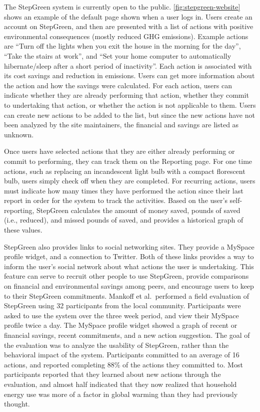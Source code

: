The StepGreen system is currently open to the public. \autoref{fig:stepgreen-website} shows an example of the default page shown when a user logs in. Users create an account on StepGreen, and then are presented with a list of actions with positive environmental consequences (mostly reduced GHG emissions). Example actions are ``Turn off the lights when you exit the house in the morning for the day'', ``Take the stairs at work'', and ``Set your home computer to automatically hibernate/sleep after a short period of inactivity''. Each action is associated with its cost savings and reduction in \COtwo emissions. Users can get more information about the action and how the savings were calculated. For each action, users can indicate whether they are already performing that action, whether they commit to undertaking that action, or whether the action is not applicable to them. Users can create new actions to be added to the list, but since the new actions have not been analyzed by the site maintainers, the financial and \COtwo savings are listed as unknown.

Once users have selected actions that they are either already performing or commit to performing, they can track them on the Reporting page. For one time actions, such as replacing an incandescent light bulb with a compact florescent bulb, users simply check off when they are completed. For recurring actions, users must indicate how many times they have performed the action since their last report in order for the system to track the activities. Based on the user's self-reporting, StepGreen calculates the amount of money saved, pounds of \COtwo saved (i.e., reduced), and missed pounds of \COtwo saved, and provides a historical graph of these values.

StepGreen also provides links to social networking sites. They provide a MySpace profile widget, and a connection to Twitter. Both of these links provides a way to inform the user's social network about what actions the user is undertaking. This feature can serve to recruit other people to use StepGreen, provide comparisons on financial and environmental savings among peers, and encourage users to keep to their StepGreen commitments. Mankoff et al.\ performed a field evaluation of StepGreen using 32 participants from the local community. Participants were asked to use the system over the three week period, and view their MySpace profile twice a day. The MySpace profile widget showed a graph of recent \COtwo or financial savings, recent commitments, and a new action suggestion. The goal of the evaluation was to analyze the usability of StepGreen, rather than the behavioral impact of the system. Participants committed to an average of 16 actions, and reported completing 88\% of the actions they committed to. Most participants reported that they learned about new actions through the evaluation, and almost half indicated that they now realized that household energy use was more of a factor in global warming than they had previously thought.

